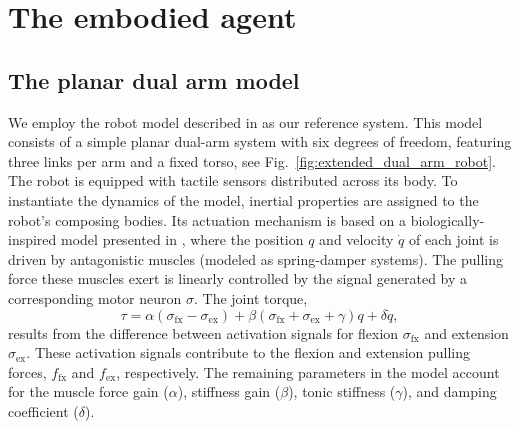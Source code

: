\section{The embodied agent}\label{sec:the_embidied_agent}
\subsection{The planar dual arm model}
We employ the robot model described in \cite{Mannella2018Knowyourbody,Marcel2022Learningreachown} as our reference system. This model consists of a simple planar dual-arm system with six degrees of freedom, featuring three links per arm and a fixed torso, see Fig.~\ref{fig:extended_dual_arm_robot}. The robot is equipped with tactile sensors distributed across its body. To instantiate the dynamics of the model, inertial properties are assigned to the robot's composing bodies. Its actuation mechanism is based on a biologically-inspired model presented in \cite{Ekeberg1993combinedneuronalmechanical,Wadden1998neuromechanicalmodel, Shim2012Chaoticexplorationlearning}, where the position $q$ and velocity $\dot{q}$ of each joint is driven by antagonistic muscles (modeled as spring-damper systems). The pulling force these muscles exert is linearly controlled by the signal generated by a corresponding motor neuron $\sigma$. The joint torque,
\begin{equation}\label{eq:antagonistic_torque}
	\tau = \alpha \left(\sigma_\mathrm{fx} - \sigma_\mathrm{ex}\right)  + \beta \left(\sigma_\mathrm{fx} + \sigma_\mathrm{ex} + \gamma \right) q + \delta \dot{q},
\end{equation}
results from the difference between activation signals for flexion $ \sigma_\mathrm{fx} $ and extension $\sigma_\mathrm{ex}$. These activation signals contribute to the flexion and extension pulling forces, $ f_\mathrm{fx}$ and $f_\mathrm{ex} $, respectively. The remaining parameters in the model account for the muscle force gain ($\alpha$), stiffness gain ($\beta$), tonic stiffness ($\gamma$), and damping coefficient ($\delta$).

